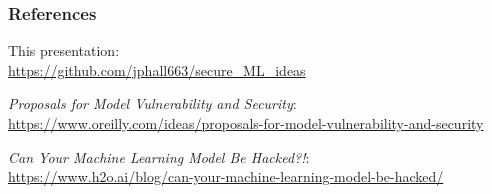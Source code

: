 \documentclass[11pt,
               aspectratio=169,
               hyperref={colorlinks}
               ]{beamer}
\begin{document}

	\begin{frame}[t, allowframebreaks]
	
		\frametitle{References}	
		
			This presentation:\\
			\footnotesize{\url{https://github.com/jphall663/secure_ML_ideas}}\normalsize
			
			\vspace{10pt}
		
			\textit{Proposals for Model Vulnerability and Security}:\\
			\footnotesize{\url{https://www.oreilly.com/ideas/proposals-for-model-vulnerability-and-security}}\normalsize
			
			\vspace{10pt}
			
			\textit{Can Your Machine Learning Model Be Hacked?!}:\\
			\footnotesize{\url{https://www.h2o.ai/blog/can-your-machine-learning-model-be-hacked/}}
			
		
		\framebreak		
		
		\printbibliography
		
	\end{frame}
\end{document}
